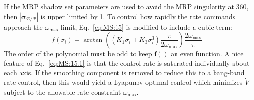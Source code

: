 \documentclass[]{AVSSimReportMemo}
\begin{document}
If the MRP shadow set parameters are used to avoid the MRP singularity at 360\dg, then $|\bm \sigma_{\mathcal{B}/\mathcal{R}}|$ is upper limited by 1.  To control how rapidly the rate commands approach the $\omega_{\text{max}}$ limit, Eq.~\eqref{eq:MS:15} is modified to include a cubic term:
\begin{equation}
	\label{eq:MS:15.1}
	 f( \sigma_{i}) = \arctan \left(
		(K_{1} \sigma_{i} +K_{3} \sigma_{i}^{3}) \frac{ \pi}{2  \omega_{\text{max}}}
	\right) \frac{2 \omega_{\text{max}}}{\pi}
\end{equation}
The order of the polynomial must be odd to keep $\bm f()$ an even function.  A nice feature of Eq.~\eqref{eq:MS:15.1} is that the control rate is saturated individually about each axis.  If the smoothing component is removed to reduce this to a bang-band rate control, then this would yield a Lyapunov optimal control which minimizes $\dot V$ subject to the allowable rate constraint $\omega_{\text{max}}$.
\end{document}
